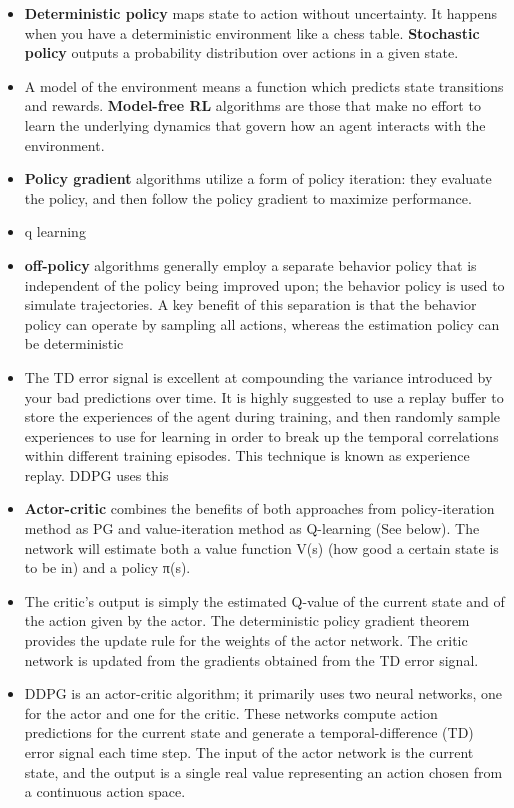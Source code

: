 \documentclass[a4paper]{article}
\begin{document}
\begin{itemize}
    \item {\bf Deterministic policy} maps state to action without uncertainty. It happens when you have a deterministic environment like a chess table. {\bf Stochastic policy} outputs a probability distribution over actions in a given state. 
    \item A model of the environment means a function which predicts state transitions and rewards. {\bf Model-free RL} algorithms are those that make no effort to learn the underlying dynamics that govern how an agent interacts with the environment.
    \item {\bf Policy gradient} algorithms utilize a form of policy iteration: they evaluate the policy, and then follow the policy gradient to maximize performance.   
    \item q learning
    \item {\bf off-policy} algorithms generally employ a separate behavior policy that is independent of the policy being improved upon; the behavior policy is used to simulate trajectories. A key benefit of this separation is that the behavior policy can operate by sampling all actions, whereas the estimation policy can be deterministic
    \item The TD error signal is excellent at compounding the variance introduced by your bad predictions over time. It is highly suggested to use a replay buffer to store the experiences of the agent during training, and then randomly sample experiences to use for learning in order to break up the temporal correlations within different training episodes. This technique is known as experience replay. DDPG uses this
    \item {\bf Actor-critic} combines the benefits of both approaches from policy-iteration method as PG and value-iteration method as Q-learning (See below). The network will estimate both a value function V(s) (how good a certain state is to be in) and a policy π(s).
    \item The critic’s output is simply the estimated Q-value of the current state and of the action given by the actor. The deterministic policy gradient theorem provides the update rule for the weights of the actor network. The critic network is updated from the gradients obtained from the TD error signal.
    \item DDPG is an actor-critic algorithm; it primarily uses two neural networks, one for the actor and one for the critic. These networks compute action predictions for the current state and generate a temporal-difference (TD) error signal each time step. The input of the actor network is the current state, and the output is a single real value representing an action chosen from a continuous action space.
\end{itemize}
\end{document}
